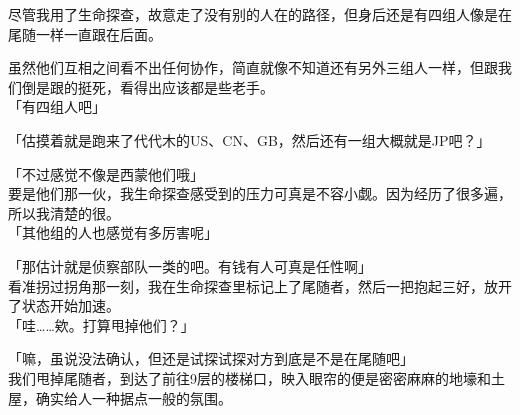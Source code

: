 尽管我用了生命探查，故意走了没有别的人在的路径，但身后还是有四组人像是在尾随一样一直跟在后面。

虽然他们互相之间看不出任何协作，简直就像不知道还有另外三组人一样，但跟我们倒是跟的挺死，看得出应该都是些老手。\\

「有四组人吧」

「估摸着就是跑来了代代木的US、CN、GB，然后还有一组大概就是JP吧？」

「不过感觉不像是西蒙他们哦」\\

要是他们那一伙，我生命探查感受到的压力可真是不容小觑。因为经历了很多遍，所以我清楚的很。\\

「其他组的人也感觉有多厉害呢」

「那估计就是侦察部队一类的吧。有钱有人可真是任性啊」\\

看准拐过拐角那一刻，我在生命探查里标记上了尾随者，然后一把抱起三好，放开了状态开始加速。\\

「哇……欸。打算甩掉他们？」

「嘛，虽说没法确认，但还是试探试探对方到底是不是在尾随吧」\\

我们甩掉尾随者，到达了前往9层的楼梯口，映入眼帘的便是密密麻麻的地壕和土屋，确实给人一种据点一般的氛围。

